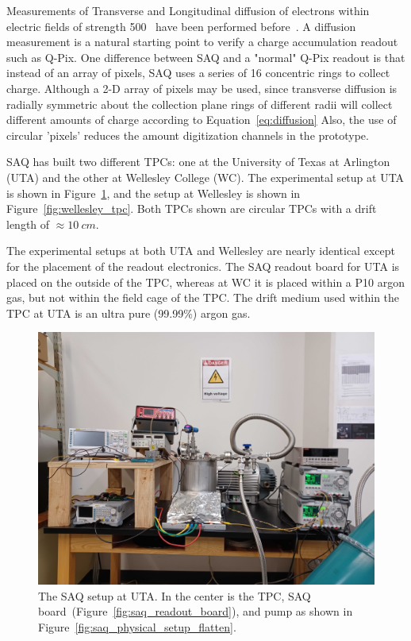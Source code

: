 Measurements of Transverse and Longitudinal diffusion of electrons within electric fields of strength 500~\unit{} have been performed before~\citep{lar_diffusion_measurement_LI2016160}.
A diffusion measurement is a natural starting point to verify a charge accumulation readout such as Q-Pix.
One difference between SAQ and a "normal" Q-Pix readout is that instead of an array of pixels, SAQ uses a series of 16 concentric rings to collect charge.
Although a 2-D array of pixels may be used, since transverse diffusion is radially symmetric about the collection plane rings of different radii will collect different amounts of charge according to Equation~\ref{eq:diffusion}
Also, the use of circular 'pixels' reduces the amount digitization channels in the prototype.

SAQ has built two different TPCs: one at the University of Texas at Arlington (UTA) and the other at Wellesley College (WC).
The experimental setup at UTA is shown in Figure~\ref{fig:saq_setup_flatten}, and the setup at Wellesley is shown in Figure~\ref{fig:wellesley_tpc}.
Both TPCs shown are circular TPCs with a drift length of $\approx 10~\unit{cm}$.

The experimental setups at both UTA and Wellesley are nearly identical except for the placement of the readout electronics.
The SAQ readout board for UTA is placed on the outside of the TPC, whereas at WC it is placed within a P10 argon gas, but not within the field cage of the TPC.
The drift medium used within the TPC at UTA is an ultra pure (99.99\%) argon gas.

\begin{figure}[]
\centering
\includegraphics[width=\textwidth]{images/SAQ_physical_setup.jpg}
\caption{The SAQ setup at UTA.
In the center is the TPC, SAQ board~(Figure~\ref{fig:saq_readout_board}), and pump as shown in Figure~\ref{fig:saq_physical_setup_flatten}.
}
\label{fig:saq_setup_flatten}
\end{figure}

